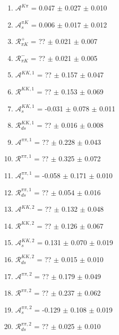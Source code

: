 \begin{enumerate}
\item $\mathcal{A}^{K\pi}$ = 0.047 $\pm$ 0.027 $\pm$ 0.010
\item $\mathcal{A}_s^{\pi K}$ = 0.006 $\pm$ 0.017 $\pm$ 0.012
\item $\mathcal{R}_{\pi K}^+$ = ?? $\pm$ 0.021 $\pm$ 0.007
\item $\mathcal{R}_{\pi K}^-$ = ?? $\pm$ 0.021 $\pm$ 0.005
\item $\mathcal{A}^{KK,1}$ = ?? $\pm$ 0.157 $\pm$ 0.047
\item $\mathcal{R}^{KK,1}$ = ?? $\pm$ 0.153 $\pm$ 0.069
\item $\mathcal{A}_s^{KK,1}$ = -0.031 $\pm$ 0.078 $\pm$ 0.011
\item $\mathcal{R}_{ds}^{KK,1}$ = ?? $\pm$ 0.016 $\pm$ 0.008
\item $\mathcal{A}^{\pi\pi,1}$ = ?? $\pm$ 0.228 $\pm$ 0.043
\item $\mathcal{R}^{\pi\pi,1}$ = ?? $\pm$ 0.325 $\pm$ 0.072
\item $\mathcal{A}_s^{\pi\pi,1}$ = -0.058 $\pm$ 0.171 $\pm$ 0.010
\item $\mathcal{R}_{ds}^{\pi\pi,1}$ = ?? $\pm$ 0.054 $\pm$ 0.016
\item $\mathcal{A}^{KK,2}$ = ?? $\pm$ 0.132 $\pm$ 0.048
\item $\mathcal{R}^{KK,2}$ = ?? $\pm$ 0.126 $\pm$ 0.067
\item $\mathcal{A}_s^{KK,2}$ = 0.131 $\pm$ 0.070 $\pm$ 0.019
\item $\mathcal{R}_{ds}^{KK,2}$ = ?? $\pm$ 0.015 $\pm$ 0.010
\item $\mathcal{A}^{\pi\pi,2}$ = ?? $\pm$ 0.179 $\pm$ 0.049
\item $\mathcal{R}^{\pi\pi,2}$ = ?? $\pm$ 0.237 $\pm$ 0.062
\item $\mathcal{A}_s^{\pi\pi,2}$ = -0.129 $\pm$ 0.108 $\pm$ 0.019
\item $\mathcal{R}_{ds}^{\pi\pi,2}$ = ?? $\pm$ 0.025 $\pm$ 0.010
\end{enumerate}
